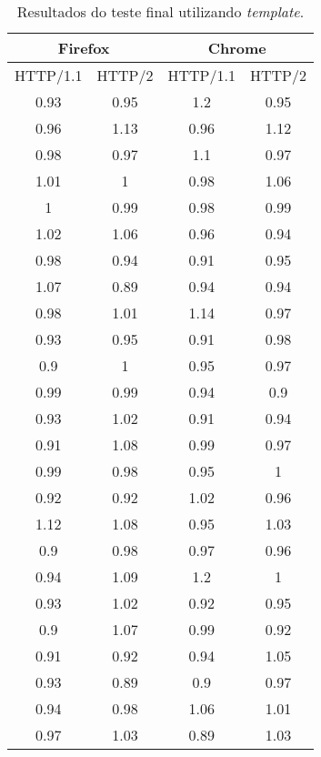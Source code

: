\begin{table}[H]
	\centering
	\caption{Resultados do teste final utilizando \textit{template}.}
	\label{resultados-template-apend}
	\begin{tabular}{cccc}
		\hline
		\multicolumn{2}{c}{\textbf{Firefox}} & \multicolumn{2}{c}{\textbf{Chrome}} \\
		\hline
		HTTP/1.1 & HTTP/2 & HTTP/1.1 & HTTP/2 \\
		\hline
		0.93 & 0.95 & 1.2 & 0.95 \\
		0.96 & 1.13 & 0.96 & 1.12 \\
		0.98 & 0.97 & 1.1 & 0.97 \\
		1.01 & 1 & 0.98 & 1.06 \\
		1   & 0.99 & 0.98 & 0.99 \\
		1.02 & 1.06 & 0.96 & 0.94 \\
		0.98 & 0.94 & 0.91 & 0.95 \\
		1.07 & 0.89 & 0.94 & 0.94 \\
		0.98 & 1.01 & 1.14 & 0.97 \\
		0.93 & 0.95 & 0.91 & 0.98 \\
		0.9 & 1 & 0.95 & 0.97 \\
		0.99 & 0.99 & 0.94 & 0.9  \\
		0.93 & 1.02 & 0.91 & 0.94 \\
		0.91 & 1.08 & 0.99 & 0.97 \\
		0.99 & 0.98 & 0.95 & 1    \\
		0.92 & 0.92 & 1.02 & 0.96 \\
		1.12 & 1.08 & 0.95 & 1.03 \\
		0.9 & 0.98 & 0.97 & 0.96 \\
		0.94 & 1.09 & 1.2 & 1    \\
		0.93 & 1.02 & 0.92 & 0.95 \\
		0.9 & 1.07 & 0.99 & 0.92 \\
		0.91 & 0.92 & 0.94 & 1.05 \\
		0.93 & 0.89 & 0.9 & 0.97 \\
		0.94 & 0.98 & 1.06 & 1.01 \\
		0.97 & 1.03 & 0.89 & 1.03 \\
		\hline
	\end{tabular}
\end{table}
